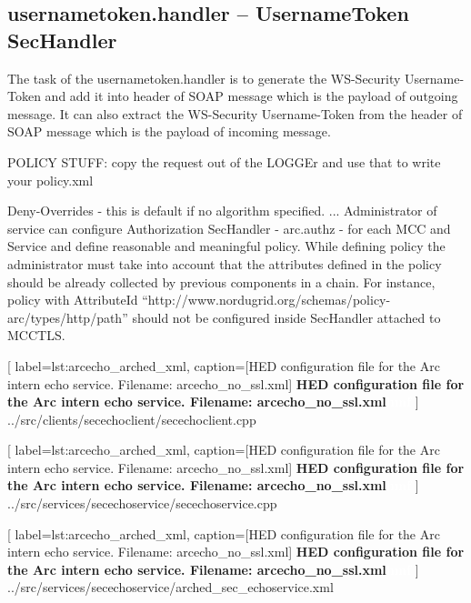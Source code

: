 \subsection{ usernametoken.handler – UsernameToken SecHandler}

The task of the usernametoken.handler is to generate the WS-Security Username-Token and add it into
header of SOAP message which is the payload of outgoing message. It can also extract the WS-Security
Username-Token from the header of SOAP message which is the payload of incoming message.


POLICY STUFF:
copy the request out of the LOGGEr and use that to write your policy.xml

Deny-Overrides - this is default if no algorithm specified.
...
Administrator of service can configure Authorization SecHandler - arc.authz - for each MCC and Service
and define reasonable and meaningful policy. While defining policy the administrator must take into
account that the attributes defined in the policy should be already collected by previous components in a
chain. For instance, policy with AttributeId “http://www.nordugrid.org/schemas/policy-
arc/types/http/path” should not be configured inside SecHandler attached to MCCTLS.


	[
	label=lst:arcecho_arched_xml,
	caption={[HED configuration file for the Arc intern echo service. Filename: arcecho\_no\_ssl.xml]
	\textbf{HED configuration file for the Arc intern echo service. Filename: arcecho\_no\_ssl.xml\textcolor{white}{hmf}}}
	]
{../src/clients/secechoclient/secechoclient.cpp}



	[
	label=lst:arcecho_arched_xml,
	caption={[HED configuration file for the Arc intern echo service. Filename: arcecho\_no\_ssl.xml]
	\textbf{HED configuration file for the Arc intern echo service. Filename: arcecho\_no\_ssl.xml\textcolor{white}{hmf}}}
	]
{../src/services/secechoservice/secechoservice.cpp}




\begin{minipage}[t]{\textwidth}

	[
	label=lst:arcecho_arched_xml,
	caption={[HED configuration file for the Arc intern echo service. Filename: arcecho\_no\_ssl.xml]
	\textbf{HED configuration file for the Arc intern echo service. Filename: arcecho\_no\_ssl.xml\textcolor{white}{hmf}}}
	]
{../src/services/secechoservice/arched_sec_echoservice.xml}
\end{minipage}



